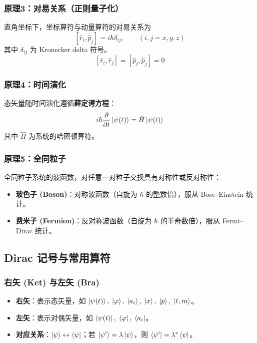 \documentclass[12pt,a4paper]{article}
\begin{document}
\subsubsection{原理3：对易关系（正则量子化）}

直角坐标下，坐标算符与动量算符的对易关系为
\[
[\hat{r}_i,\hat{p}_j]=i\hbar\delta_{ij},\qquad (i,j=x,y,z)
\]
其中 $\delta_{ij}$ 为 Kronecker delta 符号。
\[
[\hat{r}_i,\hat{r}_j]=[\hat{p}_i,\hat{p}_j]=0
\]

\subsubsection{原理4：时间演化}

态矢量随时间演化遵循\textbf{薛定谔方程}：
\[
i\hbar\frac{\partial}{\partial t}\ket{\psi(t)}=\hat{H}\ket{\psi(t)}
\]
其中 $\hat{H}$ 为系统的哈密顿算符。

\subsubsection{原理5：全同粒子}

全同粒子系统的波函数，对任意一对粒子交换具有对称性或反对称性：

\begin{itemize}
    \item \textbf{玻色子 (Boson)}：对称波函数（自旋为 $\hbar$ 的整数倍），服从 Bose--Einstein 统计。
    \item \textbf{费米子 (Fermion)}：反对称波函数（自旋为 $\hbar$ 的半奇数倍），服从 Fermi--Dirac 统计。
\end{itemize}

\subsection{Dirac 记号与常用算符}

\subsubsection{右矢 (Ket) 与左矢 (Bra)}

\begin{itemize}
    \item \textbf{右矢}：表示态矢量，如 $\ket{\psi(t)},\;\ket{\varphi},\;\ket{a_i},\;\ket{x},\;\ket{p},\;\ket{\ell,m}$。
    \item \textbf{左矢}：表示对偶矢量，如 $\bra{\psi(t)},\;\bra{\varphi},\;\bra{a_i}$。
    \item \textbf{对应关系}：$\ket{\psi}\leftrightarrow\bra{\psi}$；若 $\ket{\psi'}=\lambda\ket{\psi}$，则 $\bra{\psi'}=\lambda^*\bra{\psi}$。
\end{itemize}
\end{document}
